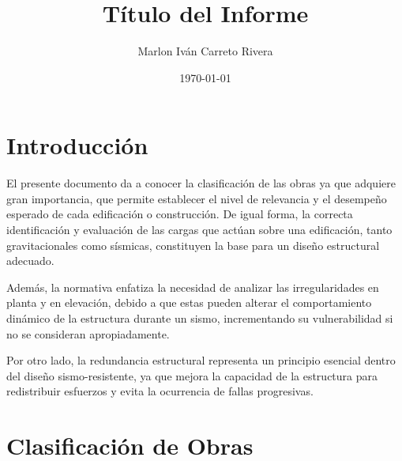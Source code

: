 \documentclass[14pt,letterpaper]{extarticle}
\title{\textbf{Título del Informe}}
\author{Marlon Iván Carreto Rivera}
\date{\today}
\begin{document}
	
		
	\thispagestyle{empty}


	\newpage
	
	
	
	
	
	
	\renewcommand{\contentsname}{Contenido}
	\tableofcontents
	\newpage
	

	
	
	\section*{Introducción }
	
	El presente documento da a conocer  la clasificación de las obras ya que adquiere gran importancia, que permite establecer el nivel de relevancia  y el desempeño esperado de cada edificación o  construcción. De igual forma, la correcta identificación y evaluación de las cargas que actúan sobre una edificación, tanto gravitacionales como sísmicas, constituyen la base para un diseño estructural adecuado.
	
	Además, la normativa enfatiza la necesidad de analizar las irregularidades en planta y en elevación, debido a que estas pueden alterar el comportamiento dinámico de la estructura durante un sismo, incrementando su vulnerabilidad si no se consideran apropiadamente.
	
	Por otro lado, la redundancia estructural representa un principio esencial dentro del diseño sismo-resistente, ya que mejora la capacidad de la estructura para redistribuir esfuerzos y evita la ocurrencia de fallas progresivas.
	

	
	
	
		\newpage

	
	\section{Clasificación de Obras}
	
\end{document}
